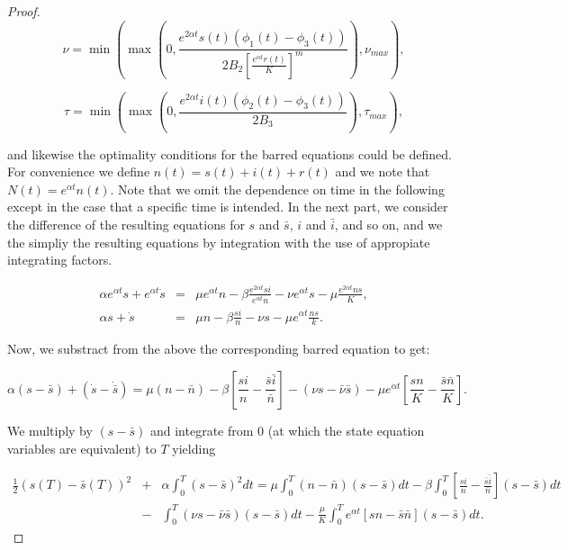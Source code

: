 \begin{proof}
\begin{equation}\label{eq.1.4.33}
\nu=\min\left(\max\left(0,\frac{e^{2\alpha t}s(t)(\phi_1(t)-\phi_3(t))}{2B_2\left[\frac{e^{\alpha t}r(t)}{K}\right]^m}\right),\nu_{max}\right),
\end{equation}

\begin{equation}\label{eq.1.4.34}
\tau=\min\left(\max\left(0,\frac{e^{2\alpha t}i(t)(\phi_2(t)-\phi_3(t))}{2B_3}\right),\tau_{max}\right),
\end{equation}

and likewise the optimality conditions for the barred equations could be defined. For convenience we define $n(t)=s(t)+i(t)+r(t)$ and we note that $N(t)=e^{\alpha t}n(t)$. Note that we omit the dependence on time in the following except in the case that a specific time is intended. In the next part, we consider the difference of the resulting equations for $s$ and $\bar{s}$, $i$ and $\bar{i}$, and so on, and we the simpliy the resulting equations by integration with the use of appropiate integrating factors.

\begin{eqnarray*}
	\alpha e^{\alpha t}s+ e^{\alpha t}\dot{s}&=&\mu e^{\alpha t}n-\beta \frac{e^{2\alpha t}si}{e^{\alpha t} n}-\nu e^{\alpha t} s-\mu \frac{e^{2\alpha t} ns}{K},\\
	\alpha s+\dot{s}&=&\mu n-\beta \frac{si}{n}-\nu s-\mu e^{\alpha t}\frac{n s}{k}.
\end{eqnarray*}

Now, we substract from the above the corresponding barred equation to get:

\begin{equation*}
\alpha (s-\bar{s})+(\dot{s}-\dot{\bar{s}})=\mu(n-\bar{n})-\beta\left[\frac{si}{n}-\frac{\bar{s}\bar{i}}{\bar{n}}\right]-(\nu s-\bar{\nu}\bar{s})-\mu e^{\alpha t}\left[\frac{sn}{K}-\frac{\bar{s}\bar{n}}{K}\right]. 
\end{equation*}

We multiply by $(s-\bar{s})$ and integrate from 0 (at which  the state equation variables are equivalent) to $T$ yielding

\begin{eqnarray}
\frac{1}{2}(s(T)-\bar{s}(T))^2&+&\alpha\int_{0}^{T}(s-\bar{s})^2dt=\mu\int_{0}^{T}(n-\bar{n})(s-\bar{s})dt-\beta\int_{0}^{T}\left[\frac{si}{n}-\frac{\bar{s}\bar{i}}{\bar{n}}\right](s-\bar{s})dt\nonumber\\
&-&\int_{0}^{T}(\nu s-\bar{\nu}\bar{s})(s-\bar{s})dt-\frac{\mu}{K}\int_{0}^{T} e^{\alpha t}\left[sn-\bar{s}\bar{n}\right](s-\bar{s})dt. \label{eq.1.4.35}
\end{eqnarray}


\end{proof}
